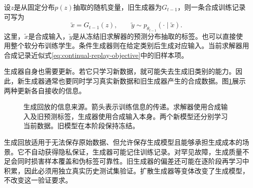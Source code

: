 设$z$是从固定分布$p(z)$抽取的随机变量，旧生成器为$G_{t-1}$，则一条合成训练记录可写为
\begin{equation}
 \tilde x=G_{t-1}(z),\qquad
 \tilde y\sim p_{\theta_{t-1}}(\cdot\mid\tilde x).
\end{equation}
这里，$\tilde x$是合成输入，$\tilde y$是从冻结旧求解器的预测分布抽取的标签。也可以直接使用整个软分布训练学生。条件生成器则在给定类别后生成对应输入。当前求解器用合成记录近似式\eqref{eq:continual-replay-objective}中的旧样本项。

生成器自身也需要更新。若它只学习新数据，就可能失去生成旧类别的能力。因此，新生成器通常也要同时学习真实新数据和旧生成器产生的合成数据。图\ref{fig:continual-generative-replay}展示两种更新各自接收的信息。
\begin{figure}[htbp]
\centering
{}
\caption{生成回放的信息来源。箭头表示训练信息的传递。求解器使用合成输入及旧预测标签，生成器使用合成输入本身。两个新模型还分别学习当前数据。旧模型在本阶段保持冻结。}
\label{fig:continual-generative-replay}
\end{figure}

生成回放适用于无法保存原始数据、但允许保存生成模型且能够承担生成成本的场景。它不自动获得隐私保证，生成器可能记住训练记录。对罕见故障，生成质量不足会同时损害样本覆盖和伪标签可靠性。旧生成器的偏差还可能在逐阶段再学习中积累，因此必须用独立真实历史测试集验证。扩散生成器等变体改变了生成模型，不改变这一验证要求。

